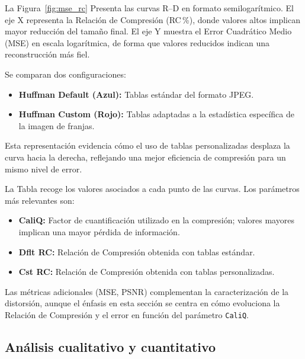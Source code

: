 \documentclass[a4paper, 12pt]{article}
\begin{document}
\begin{table}[h]
\centering
{}
\caption{Ejemplo Tabla}
\label{tab:sailboat}
\end{table}
\vspace{0.5cm}


La Figura~\ref{fig:mse_rc} Presenta las curvas R--D en formato semilogarítmico. El eje X representa la Relación de Compresión (RC\,\%), donde valores altos implican mayor reducción del tamaño final. El eje Y muestra el Error Cuadrático Medio (MSE) en escala logarítmica, de forma que valores reducidos indican una reconstrucción más fiel.

Se comparan dos configuraciones:
\begin{itemize}
    \item \textbf{Huffman Default (Azul):} Tablas estándar del formato JPEG.
    \item \textbf{Huffman Custom (Rojo):} Tablas adaptadas a la estadística específica de la imagen de franjas.
\end{itemize}

Esta representación evidencia cómo el uso de tablas personalizadas desplaza la curva hacia la derecha, reflejando una mejor eficiencia de compresión para un mismo nivel de error.

La Tabla recoge los valores asociados a cada punto de las curvas. Los parámetros más relevantes son:

\begin{itemize}
    \item \textbf{CaliQ:} Factor de cuantificación utilizado en la compresión; valores mayores implican una mayor pérdida de información.
    \item \textbf{Dflt RC:} Relación de Compresión obtenida con tablas estándar.
    \item \textbf{Cst RC:} Relación de Compresión obtenida con tablas personalizadas.
\end{itemize}

Las métricas adicionales (MSE, PSNR) complementan la caracterización de la distorsión, aunque el énfasis en esta sección se centra en cómo evoluciona la Relación de Compresión y el error en función del parámetro \texttt{CaliQ}.
\subsection{Análisis cualitativo y cuantitativo}

\end{document}
